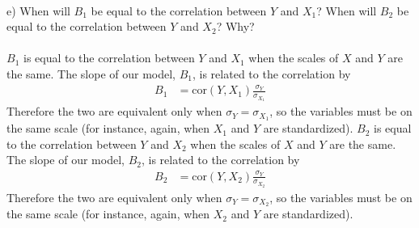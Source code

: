 \documentclass[onecolumn,10pt]{jhwhw}
\begin{document}
\\
e) When will $B_1$ be equal to the correlation between $Y$ and $X_1$? When will $B_2$ be equal to the correlation between $Y$ and $X_2$? Why?\\
\\
$B_1$ is equal to the correlation between $Y$ and $X_1$ when the scales of $X$ and $Y$ are the same. The slope of our model, $B_1$, is related to the correlation by
\begin{align*}
B_1 &= \mbox{cor}(Y, X_1) \frac{\sigma_Y}{\sigma_{X_1}}
\end{align*}
Therefore the two are equivalent only when $\sigma_{Y} = \sigma_{X_1}$, so the variables must be on the same scale (for instance, again, when $X_1$ and $Y$ are standardized). $B_2$ is equal to the correlation between $Y$ and $X_2$ when the scales of $X$ and $Y$ are the same. The slope of our model, $B_2$, is related to the correlation by
\begin{align*}
B_2 &= \mbox{cor}(Y, X_2) \frac{\sigma_Y}{\sigma_{X_2}}
\end{align*}
Therefore the two are equivalent only when $\sigma_{Y} = \sigma_{X_2}$, so the variables must be on the same scale (for instance, again, when $X_2$ and $Y$ are standardized).\\
\\
\end{document}
